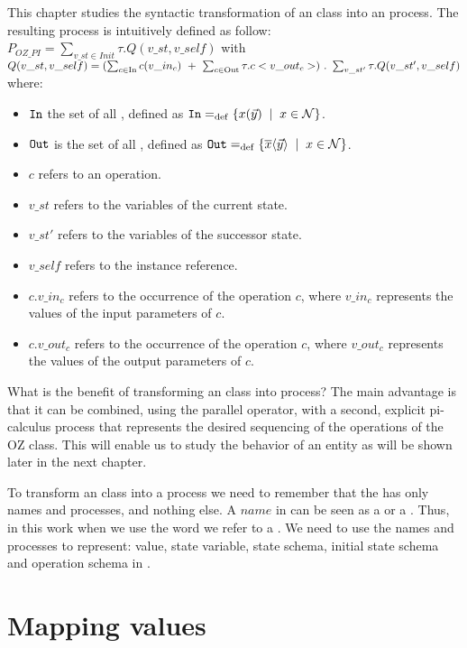 This chapter studies the syntactic transformation of an \oz{} class into an \picalc{} process. The resulting process is intuitively defined as follow:\\
$P_{OZ\_PI} = \sum_{v\_st\in Init}^{} \tau. Q(v\_st,v\_self)$ with
$\\Q(v\_st,v\_self) = (\sum_{c\in \text{In}}^{} c(v\_in_{c}) \ +\ \sum_{c\in \text{Out}}^{} \tau.c<v\_out_{c}>)\ .\ \sum_{v\_st'}^{} \tau.Q(v\_st',v\_self)$
where:
\begin{itemize}
\item $\mathtt{In}$ the set of all , defined as $\inA\define\set[x\in\names]{\inp{x}{\vec{y}}}$.
\item $\mathtt{Out}$ is the set of all , defined as $\outA\define\set[x\in\names]{\out{x}{\vec{y}}}$.
\item $c$ refers to an operation.
\item $v\_st$ refers to the variables of the current state.
\item $v\_st'$ refers to the variables of the successor state.
\item $v\_self$ refers to the instance reference.
\item $c.v\_in_{c}$ refers to the occurrence of the operation $c$, where $v\_in_{c}$ represents the values of the input parameters of $c$.
\item $c.v\_out_{c}$ refers to the occurrence of the operation $c$, where $v\_out_{c}$ represents the values of the output parameters of $c$.
\end{itemize}
What is the benefit of transforming an \oz{} class into \picalc{} process? The main advantage is that it can be combined, using the
parallel operator, with a second, explicit pi-calculus
process that represents the desired sequencing of the operations
of the OZ class. This will enable us to study the behavior of an entity as will be shown later in the next chapter.

To transform an \oz{} class into a \picalc{} process we need to remember that the \picalc{} has only names and processes, and nothing else. A $name$ in \picalc{} can be seen as a  or a . Thus, in this work when we use the word  we refer to a \picalc{} . We need to use the names and processes to represent: value, state variable, state schema, initial state schema and operation schema in \picalc{}.
\section{Mapping values}
\label{sec_tra_mapping_values}


